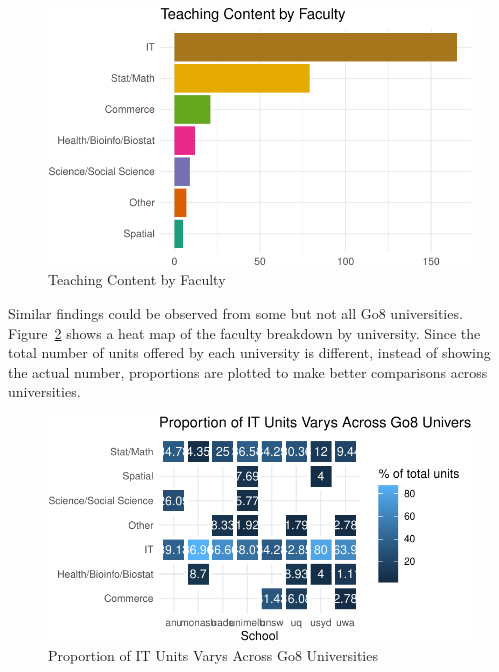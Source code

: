 \documentclass[
  letterpaper,
]{report}
\begin{document}
\begin{figure}

{\centering \includegraphics{./03_2-unitext_files/figure-pdf/fig-unitcode-1.pdf}

}

\caption{\label{fig-unitcode}Teaching Content by Faculty}

\end{figure}

Similar findings could be observed from some but not all Go8
universities. Figure~\ref{fig-tile} shows a heat map of the faculty
breakdown by university. Since the total number of units offered by each
university is different, instead of showing the actual number,
proportions are plotted to make better comparisons across universities.

\begin{figure}

{\centering \includegraphics{./03_2-unitext_files/figure-pdf/fig-tile-1.pdf}

}

\caption{\label{fig-tile}Proportion of IT Units Varys Across Go8
Universities}

\end{figure}
\end{document}
